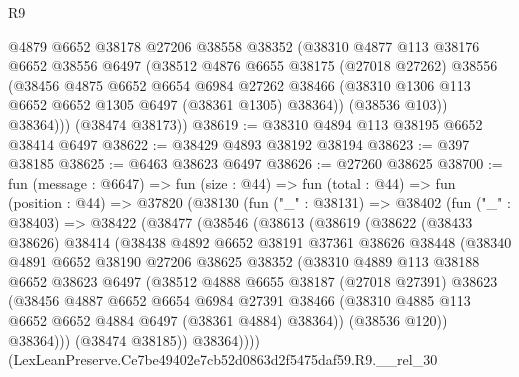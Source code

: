 \begin{lexlean}{R9}
\begin{coremodule}
          @4879
          @6652
          @38178
          @27206
          @38558
          @38352
          (@38310
            @4877
            @113
            @38176
            @6652
            @38556
            @6497
            (@38512
              @4876
              @6655
              @38175
              (@27018 @27262)
              @38556
              (@38456
                @4875
                @6652
                @6654
                @6984
                @27262
                @38466
                (@38310 @1306 @113 @6652 @6652 @1305 @6497 (@38361 @1305) @38364))
              (@38536 @103))
            @38364)))
      (@38474 @38173))
@38619 := @38310 @4894 @113 @38195 @6652 @38414 @6497
@38622 := @38429 @4893 @38192 @38194
@38623 := @397 @38185
@38625 := @6463 @38623 @6497
@38626 := @27260 @38625
@38700 := fun (message : @6647) =>
  fun (size : @44) =>
  fun (total : @44) =>
  fun (position : @44) =>
  @37820
    (@38130
      (fun ("_" : @38131) =>
      @38402
        (fun ("_" : @38403) =>
        @38422
          (@38477
            (@38546
              (@38613
                (@38619
                  (@38622
                    (@38433 @38626)
                    @38414
                    (@38438
                      @4892
                      @6652
                      @38191
                      @37361
                      @38626
                      @38448
                      (@38340
                        @4891
                        @6652
                        @38190
                        @27206
                        @38625
                        @38352
                        (@38310
                          @4889
                          @113
                          @38188
                          @6652
                          @38623
                          @6497
                          (@38512
                            @4888
                            @6655
                            @38187
                            (@27018 @27391)
                            @38623
                            (@38456
                              @4887
                              @6652
                              @6654
                              @6984
                              @27391
                              @38466
                              (@38310 @4885 @113 @6652 @6652 @4884 @6497 (@38361 @4884) @38364))
                            (@38536 @120))
                          @38364)))
                    (@38474 @38185))
                  @38364))))
          (LexLeanPreserve.Ce7be49402e7cb52d0863d2f5475daf59.R9.__rel_30

\end{coremodule}
\end{lexlean}
